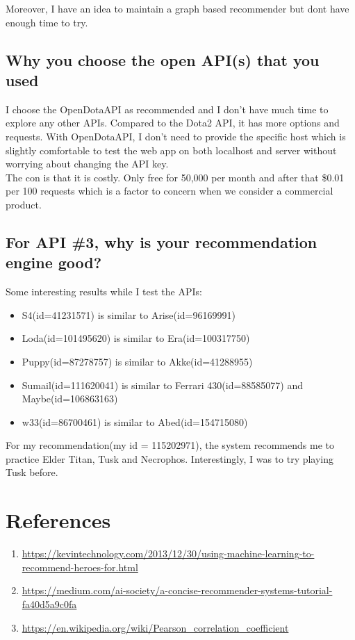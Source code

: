 \noindent Moreover, I have an idea to maintain a graph based recommender but dont have enough time to try.

\subsection{Why you choose the open API(s) that you used}

I choose the OpenDotaAPI as recommended and I don't have much time to explore any other APIs. Compared to the Dota2 API, it has more options and requests. With OpenDotaAPI, I don't need to provide the specific host which is slightly comfortable to test the web app on both localhost and server without worrying about changing the API key. \\

\noindent The con is that it is costly. Only free for 50,000 per month and after that \$0.01 per 100 requests which is a factor to concern when we consider a commercial product.

\subsection{For API \#3, why is your recommendation engine good?}

Some interesting results while I test the APIs:
\begin{itemize}
    \item S4(id=41231571) is similar to Arise(id=96169991)
    \item Loda(id=101495620) is similar to Era(id=100317750)
    \item Puppy(id=87278757) is similar to Akke(id=41288955)
    \item Sumail(id=111620041) is similar to Ferrari 430(id=88585077) and Maybe(id=106863163)
    \item w33(id=86700461) is similar to Abed(id=154715080)
\end{itemize}

\noindent For my recommendation(my id = 115202971), the system recommends me to practice Elder Titan, Tusk and Necrophos. Interestingly, I was to try playing Tusk before.

\newpage
\section{References}
\begin{enumerate}
    \item \url{https://kevintechnology.com/2013/12/30/using-machine-learning-to-recommend-heroes-for.html}
    \item \url{https://medium.com/ai-society/a-concise-recommender-systems-tutorial-fa40d5a9c0fa}
    \item \url{https://en.wikipedia.org/wiki/Pearson_correlation_coefficient}
\end{enumerate}
